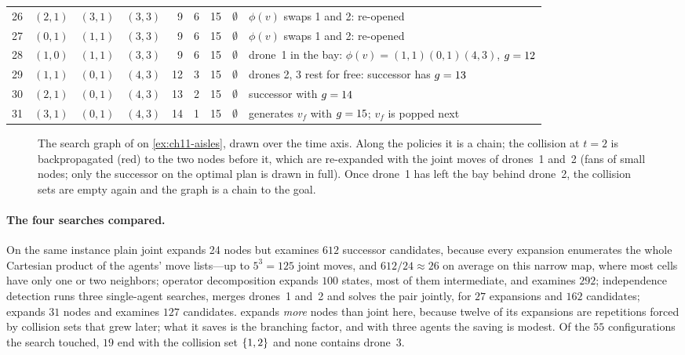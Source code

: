 \begin{table}[!tb]
\begin{tabular}{@{}rlllrrrll@{}}
  26 & $(2,1)$ & $(3,1)$ & $(3,3)$ &  9 &  6 & 15 & $\emptyset$ & $\phi(v)$ swaps 1 and 2: re-opened\\
  27 & $(0,1)$ & $(1,1)$ & $(3,3)$ &  9 &  6 & 15 & $\emptyset$ & $\phi(v)$ swaps 1 and 2: re-opened\\
  28 & $(1,0)$ & $(1,1)$ & $(3,3)$ &  9 &  6 & 15 & $\emptyset$ & drone~1 in the bay: $\phi(v) = (1,1)(0,1)(4,3)$, $g = 12$\\
  29 & $(1,1)$ & $(0,1)$ & $(4,3)$ & 12 &  3 & 15 & $\emptyset$ & drones 2, 3 rest for free: successor has $g = 13$\\
  30 & $(2,1)$ & $(0,1)$ & $(4,3)$ & 13 &  2 & 15 & $\emptyset$ & successor with $g = 14$\\
  31 & $(3,1)$ & $(0,1)$ & $(4,3)$ & 14 &  1 & 15 & $\emptyset$ & generates $v_f$ with $g = 15$; $v_f$ is popped next\\
  \bottomrule
  \end{tabular}
\end{table}

\begin{figure}[!tb]
  \centering
  \caption{The search graph of \mstar on \cref{ex:ch11-aisles}, drawn over
  the time axis. Along the policies it is a chain; the collision at $t = 2$
  is backpropagated (red) to the two nodes before it, which are re-expanded
  with the joint moves of drones~1 and~2 (fans of small nodes; only the
  successor on the optimal plan is drawn in full). Once drone~1 has left the
  bay behind drone~2, the collision sets are empty again and the graph is a
  chain to the goal.}
  \label{fig:ch11-search-graph}
\end{figure}

\paragraph{The four searches compared.} On the same instance plain joint
\astar expands 24 nodes but examines $612$ successor candidates, because
every expansion enumerates the whole Cartesian product of the agents' move
lists---up to $5^3 = 125$ joint moves, and $612/24 \approx 26$ on average on
this narrow map, where most cells have only one or two neighbors; operator
decomposition
expands $100$ states, most of them intermediate, and examines $292$;
independence detection runs three single-agent searches, merges drones~1
and~2 and solves the pair jointly, for $27$ expansions and $162$ candidates;
\mstar expands $31$ nodes and examines $127$ candidates. \mstar expands
\emph{more} nodes than joint \astar here, because twelve of its expansions
are repetitions forced by collision sets that grew later; what it saves is
the branching factor, and with three agents the saving is modest. Of the
$55$ configurations the search touched, $19$ end with the collision set
$\left\{ 1,2 \right\}$ and none contains drone~3.

